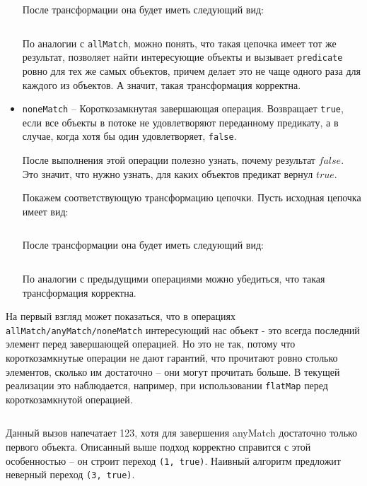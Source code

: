 \begin{itemize}
	\inputminted{java}{chapter2/code/anyMatch.java}
	
	После трансформации она будет иметь следующий вид:
	
	\inputminted{java}{chapter2/code/anyMatchTransform.java}
	
	По аналогии с \texttt{allMatch}, можно понять, что такая цепочка имеет тот же результат, позволяет найти интересующие объекты и вызывает \texttt{predicate} ровно для тех же самых объектов, причем делает это не чаще одного раза для каждого из объектов. А значит, такая трансформация корректна.
	\item \texttt{noneMatch} -- Короткозамкнутая завершающая операция. Возвращает \texttt{true}, если все объекты в потоке не удовлетворяют переданному предикату, а в случае, когда хотя бы один удовлетворяет, \texttt{false}.
	
	После выполнения этой операции полезно узнать, почему результат $false$. Это значит, что нужно узнать, для каких объектов предикат вернул $true$. 
	
	Покажем соответствующую трансформацию цепочки. Пусть исходная цепочка имеет вид:
	\inputminted{java}{chapter2/code/noneMatch.java}
	
	После трансформации она будет иметь следующий вид:
	
	\inputminted{java}{chapter2/code/noneMatchTransform.java}
	
	По аналогии с предыдущими операциями можно убедиться, что такая трансформация корректна.
\end{itemize}

На первый взгляд может показаться, что в операциях \texttt{allMatch/anyMatch/noneMatch} интересующий нас объект - это всегда последний элемент перед завершающей операцией. Но это не так, потому что короткозамкнутые операции не дают гарантий, что прочитают ровно столько элементов, сколько им достаточно -- они могут прочитать больше. В текущей реализации это наблюдается, например, при использовании \texttt{flatMap} перед короткозамкнутой операцией. 
\inputminted{java}{chapter2/code/flatMapBeforeAnyMatch.java}
Данный вызов напечатает 123, хотя для завершения anyMatch достаточно только первого объекта. Описанный выше подход корректно справится с этой особенностью -- он строит переход \texttt{(1, true)}. Наивный алгоритм предложит неверный переход \texttt{(3, true)}.

